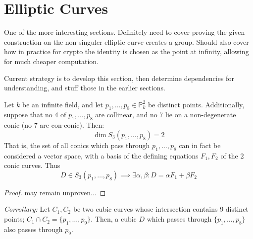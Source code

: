 \section{Elliptic Curves}

One of the more interesting sections. Definitely need to
cover proving the given construction on the non-singuler elliptic
curve creates a group. Should also cover how in practice for crypto
the identity is chosen as the point at infinity, allowing for 
much cheaper computation.

Current strategy is to develop this section, then determine
dependencies for understanding, and stuff those in the
earlier sections.

\hrulefill

\begin{theorem}
\label{thm:cubicintersectionpoints}
Let $k$ be an infinite field, and let $p_1, \dots, p_8 \in \mathbb{P}^2_k$
be distinct points. Additionally, suppose that no 4 of $p_1, \dots, p_8$ are
collinear, and no 7 lie on a non-degenerate conic (no 7 are con-conic). Then:
\[
	\dim S_3(p_1, \dots, p_8) = 2
\]
That is, the set of all conics which pass through $p_1, \dots, p_8$ can in
fact be considered a vector space, with a basis of the defining equations $F_1, F_2$
of the 2 conic curves. Thus
\[
	D \in S_3(p_1, \dots, p_8) \implies \exists \alpha, \beta : D = \alpha F_1 + \beta F_2
\]
\end{theorem}

\begin{proof}
may remain unproven...
\end{proof}

\begin{theorem}
\emph{Corrollary:}
Let $C_1, C_2$ be two cubic curves whose intersection contains 9 distinct points;
$C_1 \cap C_2 = \{p_1, \dots, p_9\}$. Then, a cubic $D$ which passes through 
$\{p_1, \dots, p_8\}$ also passes through $p_9$.
\end{theorem}

